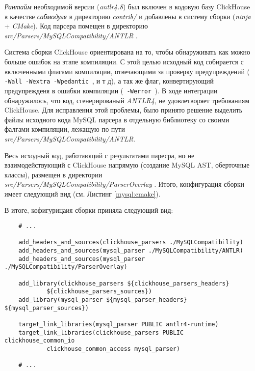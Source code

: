 \textit{Рантайм} необходимой версии (\textit{antlr4.8}) был включен в кодовую базу ClickHouse в качестве \textit{сабмодуля} в директорию \textit{contrib/} и добавлены в систему сборки (\textit{ninja} + \textit{CMake}). Код парсера помещен в директорию\\ \textit{src/Parsers/MySQLCompatibility/ANTLR} \cite{merge_request}.

Система сборки ClickHouse ориентирована на то, чтобы обнаруживать как можно больше ошибок на этапе компиляции. С этой целью исходный код собирается с включенными флагами компиляции, отвечающими за проверку предупреждений (\texttt{ -Wall -Wextra -Wpedantic }, и т д), а так же флаг, конвертирующий предупрежденя в ошибки компиляции (\texttt{ -Werror }). В ходе интеграции обнаружилось, что код, сгенерированый \textit{ANTLR4}, не удовлетворяет требованиям ClickHouse. Для исправления этой проблемы, было принято решение выделить файлы исходного кода MySQL парсера в отдельную библиотеку со своими фалгами компиляции, лежащую по пути \textit{src/Parsers/MySQLCompatibility/ANTLR}\cite{merge_request}. 

Весь исходный код, работающий с результатами паресра, но не взаимодействующий с ClickHouse напрямую (создание MySQL AST, оберточные классы), размещен в директории \textit{src/Parsers/MySQLCompatibility/ParserOverlay} \cite{merge_request}. Итого, конфигурация сборки имеет следующий вид (см. Листинг \ref{mysql:cmake}).

В итоге, кофигурицаия сборки приняла следующий вид:
\begin{code}
    \label{mysql:cmake}
    \begin{verbatim}
    # ...

    add_headers_and_sources(clickhouse_parsers ./MySQLCompatibility)
    add_headers_and_sources(mysql_parser ./MySQLCompatibility/ANTLR)
    add_headers_and_sources(mysql_parser ./MySQLCompatibility/ParserOverlay)

    add_library(clickhouse_parsers ${clickhouse_parsers_headers}
            ${clickhouse_parsers_sources})
    add_library(mysql_parser ${mysql_parser_headers} ${mysql_parser_sources})

    target_link_libraries(mysql_parser PUBLIC antlr4-runtime)
    target_link_libraries(clickhouse_parsers PUBLIC clickhouse_common_io
            clickhouse_common_access mysql_parser)

    # ...
    \end{verbatim}
\end{code}

